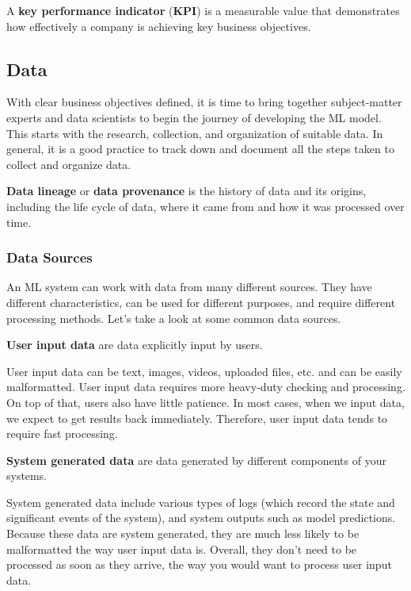 A \textbf{key performance indicator} (\textbf{KPI}) is a measurable value that demonstrates how effectively a company
is achieving key business objectives.
\ed

\subsection{Data}

With clear business objectives defined, it is time to bring together subject-matter experts and data scientists to
begin the journey of developing the ML model. This starts with the research, collection, and organization of suitable
data. In general, it is a good practice to track down and document all the steps taken to collect and organize data.

\textbf{Data lineage} or \textbf{data provenance} is the history of data and its origins, including the life cycle of
data, where it came from and how it was processed over time.
\ed

\subsubsection{Data Sources}

An ML system can work with data from many different sources. They have different characteristics, can be used for
different purposes, and require different processing methods. Let's take a look at some common data sources.

\textbf{User input data} are data explicitly input by users.
\ed

User input data can be text, images, videos, uploaded files, etc. and can be easily malformatted. User input data
requires more heavy-duty checking and processing. On top of that, users also have little patience. In most cases,
when we input data, we expect to get results back immediately. Therefore, user input data tends to require fast
processing.

\textbf{System generated data} are data generated by different components of your systems.
\ed

System generated data include various types of logs (which record the state and significant events of the system),
and system outputs such as model predictions. Because these data are system generated, they are much less likely to
be malformatted the way user input data is. Overall, they don't need to be processed as soon as they arrive, the way
you would want to process user input data.

